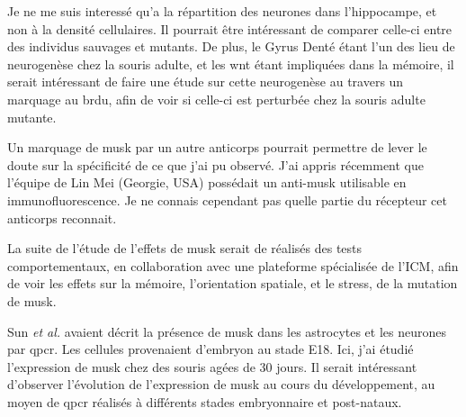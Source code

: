 Je ne me suis interessé qu'a la répartition des neurones dans l'hippocampe, et non à la densité cellulaires. Il pourrait être intéressant de comparer celle-ci entre des individus sauvages et mutants. De plus, le Gyrus Denté étant l'un des lieu de neurogenèse chez la souris adulte, et les \gls{wnt} étant impliquées dans la mémoire, il serait intéressant de faire une étude sur cette neurogenèse au travers un marquage au \gls{brdu}, afin de voir si celle-ci est perturbée chez la souris adulte mutante.

Un marquage de \gls{musk} par un autre anticorps pourrait permettre de lever le doute sur la spécificité de ce que j'ai pu observé. J'ai appris récemment que l'équipe de Lin Mei (Georgie, USA) possédait un anti-\gls{musk} utilisable en immunofluorescence. Je ne connais cependant pas quelle partie du récepteur cet anticorps reconnait.

La suite de l'étude de l'effets de \gls{musk} serait de réalisés des tests comportementaux, en collaboration avec une plateforme spécialisée de l'ICM, afin de voir les effets sur la mémoire, l'orientation spatiale, et le stress, de la mutation de \gls{musk}.

Sun \emph{et al.} avaient décrit la présence de \gls{musk} dans les astrocytes et les neurones par \gls{qpcr}. Les cellules provenaient d'embryon au stade E18. Ici, j'ai étudié l'expression de \gls{musk} chez des souris agées de 30 jours. Il serait intéressant d'observer l'évolution de l'expression de \gls{musk} au cours du développement, au moyen de \gls{qpcr} réalisés à différents stades embryonnaire et post-nataux.